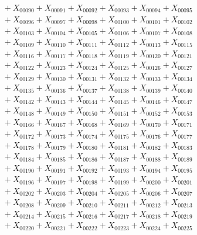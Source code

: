 \documentclass[a4paper,10pt]{article}
\begin{document}
{\begin{align}
&\quad  + X_{00090} + X_{00091} + X_{00092} + X_{00093} + X_{00094} + X_{00095} \\[0.5ex]
&\quad  + X_{00096} + X_{00097} + X_{00098} + X_{00100} + X_{00101} + X_{00102} \\[0.5ex]
&\quad  + X_{00103} + X_{00104} + X_{00105} + X_{00106} + X_{00107} + X_{00108} \\[0.5ex]
&\quad  + X_{00109} + X_{00110} + X_{00111} + X_{00112} + X_{00113} + X_{00115} \\[0.5ex]
&\quad  + X_{00116} + X_{00117} + X_{00118} + X_{00119} + X_{00120} + X_{00121} \\[0.5ex]
&\quad  + X_{00122} + X_{00123} + X_{00124} + X_{00125} + X_{00126} + X_{00127} \\[0.5ex]
&\quad  + X_{00129} + X_{00130} + X_{00131} + X_{00132} + X_{00133} + X_{00134} \\[0.5ex]
&\quad  + X_{00135} + X_{00136} + X_{00137} + X_{00138} + X_{00139} + X_{00140} \\[0.5ex]
&\quad  + X_{00142} + X_{00143} + X_{00144} + X_{00145} + X_{00146} + X_{00147} \\[0.5ex]
&\quad  + X_{00148} + X_{00149} + X_{00150} + X_{00151} + X_{00152} + X_{00153} \\[0.5ex]
&\quad  + X_{00166} + X_{00167} + X_{00168} + X_{00169} + X_{00170} + X_{00171} \\[0.5ex]
&\quad  + X_{00172} + X_{00173} + X_{00174} + X_{00175} + X_{00176} + X_{00177} \\[0.5ex]
&\quad  + X_{00178} + X_{00179} + X_{00180} + X_{00181} + X_{00182} + X_{00183} \\[0.5ex]
&\quad  + X_{00184} + X_{00185} + X_{00186} + X_{00187} + X_{00188} + X_{00189} \\[0.5ex]
&\quad  + X_{00190} + X_{00191} + X_{00192} + X_{00193} + X_{00194} + X_{00195} \\[0.5ex]
&\quad  + X_{00196} + X_{00197} + X_{00198} + X_{00199} + X_{00200} + X_{00201} \\[0.5ex]
&\quad  + X_{00202} + X_{00203} + X_{00204} + X_{00205} + X_{00206} + X_{00207} \\[0.5ex]
&\quad  + X_{00208} + X_{00209} + X_{00210} + X_{00211} + X_{00212} + X_{00213} \\[0.5ex]
&\quad  + X_{00214} + X_{00215} + X_{00216} + X_{00217} + X_{00218} + X_{00219} \\[0.5ex]
&\quad  + X_{00220} + X_{00221} + X_{00222} + X_{00223} + X_{00224} + X_{00225} \\[0.5ex]

\end{align}}
\end{document}
